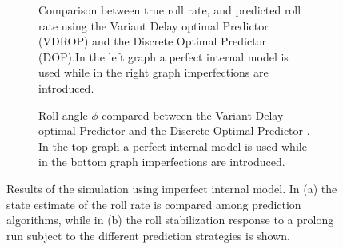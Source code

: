 \begin{figure}
    \centering
    \begin{subfigure}[b]{\textwidth}
        \caption{Comparison between true roll rate, and predicted roll rate using the Variant Delay optimal Predictor (VDROP) and the  Discrete Optimal Predictor (DOP).In the left graph a perfect internal model is used while in the right graph imperfections are introduced.}
        \label{fig:predictor_compare}
    \end{subfigure}
    \begin{subfigure}[b]{\textwidth}
        \centering
        \caption{Roll angle \ensuremath{\phi} compared between  the Variant Delay optimal Predictor and the Discrete Optimal Predictor . In the top graph a perfect internal model is used while in the bottom graph imperfections are introduced.}            
        \label{fig:predictor_compare2}
    \end{subfigure}
    \caption{Results of the simulation using imperfect internal model. In (a) the state estimate of the roll rate is compared among prediction algorithms, while in (b) the roll stabilization response to a prolong run subject to  the different prediction strategies is shown.}
    \label{fig:predictor_compareA}
 \end{figure}


